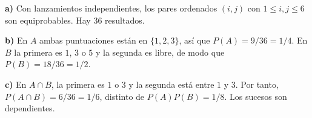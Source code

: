 \textbf{a)} Con lanzamientos independientes, los pares ordenados $(i,j)$ con $1\le i,j\le6$ son equiprobables. Hay $\boxed{36}$ resultados.

\textbf{b)} En $A$ ambas puntuaciones están en $\{1,2,3\}$, así que $P(A)=9/36=\boxed{1/4}$. En $B$ la primera es $1$, $3$ o $5$ y la segunda es libre, de modo que $P(B)=18/36=\boxed{1/2}$.

\textbf{c)} En $A\cap B$, la primera es $1$ o $3$ y la segunda está entre $1$ y $3$. Por tanto, $P(A\cap B)=6/36=1/6$, distinto de $P(A)P(B)=1/8$. Los sucesos son dependientes.
